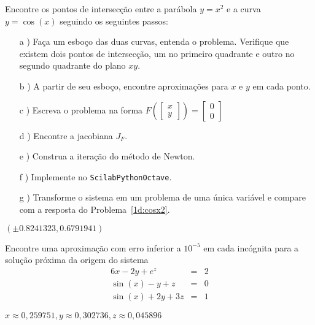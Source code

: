 \begin{exer} Encontre os pontos de intersecção entre a parábola $y=x^2$ e a curva $y=\cos(x)$ seguindo os seguintes passos:
\begin{itemize}
\item[a]) Faça um esboço das duas curvas, entenda o problema. Verifique que existem dois pontos de intersecção, um no primeiro quadrante e outro no segundo quadrante do plano $xy$.
\item[b]) A partir de seu esboço, encontre aproximações para $x$ e $y$ em cada ponto.
\item[c]) Escreva o problema na forma $F\left(\left[\begin{array}{c}x\\y\end{array}\right]\right)=\left[\begin{array}{c}0\\0\end{array}\right]$
\item[d]) Encontre a jacobiana $J_F$.
\item[e]) Construa a iteração do método de Newton.
\item[f]) Implemente no \ifisscilab\verb+Scilab+\fi\ifispython\verb+Python+\fi\ifisoctave\verb+Octave+\fi.
\item[g]) Transforme o sistema em um problema de uma única variável e compare com a resposta do Problema~\ref{1d:cosx2}.
\end{itemize}
\end{exer}
\begin{resp}
 $\left(\pm 0.8241323, 0.6791941\right)$
\end{resp}

\begin{exer} Encontre uma aproximação com erro inferior a $10^{-5}$ em cada incógnita para a solução próxima da origem do sistema
\begin{eqnarray}
6x-2y+e^{z}&=&2\\
\sin(x)-y+z&=&0\\
\sin(x)+2y+3z&=&1
\end{eqnarray}
\end{exer}
\begin{resp}
$x\approx 0,259751, y\approx  0,302736, z\approx  0,045896$
\end{resp}


